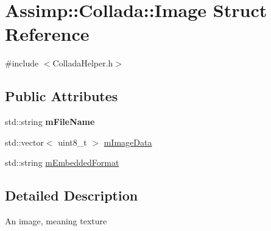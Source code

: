 \hypertarget{struct_assimp_1_1_collada_1_1_image}{\section{Assimp\+:\+:Collada\+:\+:Image Struct Reference}
\label{struct_assimp_1_1_collada_1_1_image}
}


{\ttfamily \#include $<$Collada\+Helper.\+h$>$}

\subsection*{Public Attributes}
\begin{DoxyCompactItemize}
\item 
\hypertarget{struct_assimp_1_1_collada_1_1_image_a47c4acd4cff98d401dc18d98559d2e73}{std\+::string {\bfseries m\+File\+Name}}\label{struct_assimp_1_1_collada_1_1_image_a47c4acd4cff98d401dc18d98559d2e73}

\item 
std\+::vector$<$ uint8\+\_\+t $>$ \hyperlink{struct_assimp_1_1_collada_1_1_image_a471fa1e1fecbdba0710c68573ec4f97d}{m\+Image\+Data}
\item 
std\+::string \hyperlink{struct_assimp_1_1_collada_1_1_image_a3c34594f80a9738ff7c98e3dd0b6b69c}{m\+Embedded\+Format}
\end{DoxyCompactItemize}


\subsection{Detailed Description}
An image, meaning texture 


